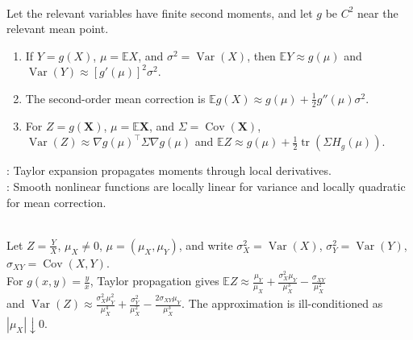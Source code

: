 \begin{method} \label{meth:moment-propagation-error-propagation} \\
Let the relevant variables have finite second moments, and let $g$ be $C^2$ near the relevant mean point.
\begin{enumerate}[label=(\roman*)]
\setlength{\itemsep}{0pt}
\item If $Y=g(X)$, $\mu=\mathbb{E}X$, and $\sigma^2=\operatorname{Var}(X)$, then $\mathbb{E}Y\approx g(\mu)$ and $\operatorname{Var}(Y)\approx[g'(\mu)]^2\sigma^2$.
\item The second-order mean correction is $\mathbb{E}g(X)\approx g(\mu)+\frac12g''(\mu)\sigma^2$.
\item For $Z=g(\mathbf{X})$, $\mu=\mathbb{E}\mathbf{X}$, and $\Sigma=\operatorname{Cov}(\mathbf{X})$, $\operatorname{Var}(Z)\approx\nabla g(\mu)^\top\Sigma\nabla g(\mu)$ and $\mathbb{E}Z\approx g(\mu)+\frac12\operatorname{tr}(\Sigma H_g(\mu))$.
\end{enumerate}
: Taylor expansion propagates moments through local derivatives.\\
: Smooth nonlinear functions are locally linear for variance and locally quadratic for mean correction.
\end{method}

\begin{example} \label{ex:ratio-moment-propagation} \\
Let $Z=\frac{Y}{X}$, $\mu_X\neq0$, $\mu=(\mu_X,\mu_Y)$, and write $\sigma_X^2=\operatorname{Var}(X)$, $\sigma_Y^2=\operatorname{Var}(Y)$, $\sigma_{XY}=\operatorname{Cov}(X,Y)$.\\
For $g(x,y)=\frac{y}{x}$, Taylor propagation gives $\mathbb{E}Z\approx\frac{\mu_Y}{\mu_X}+\frac{\sigma_X^2\mu_Y}{\mu_X^3}-\frac{\sigma_{XY}}{\mu_X^2}$\\
and $\operatorname{Var}(Z)\approx\frac{\sigma_X^2\mu_Y^2}{\mu_X^4}+\frac{\sigma_Y^2}{\mu_X^2}-\frac{2\sigma_{XY}\mu_Y}{\mu_X^3}$. The approximation is ill-conditioned as $|\mu_X|\downarrow0$.
\end{example}
